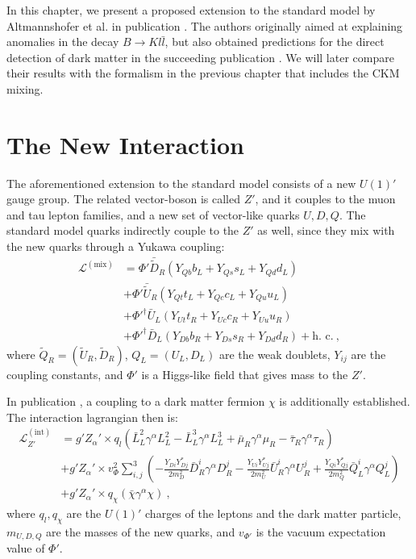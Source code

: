In this chapter, we present a proposed extension to the standard model by Altmannshofer et al. in publication \cite{InColour}. The authors originally aimed at explaining anomalies in the decay $B\rightarrow Kl\bar{l}$, but also obtained predictions for the direct detection of dark matter in the succeeding publication \cite{Z}. We will later compare their results with the formalism in the previous chapter that includes the CKM mixing.

\section{The New Interaction}
The aforementioned extension to the standard model consists of a new $U(1)'$ gauge group. The related vector-boson is called $Z'$, and it couples to the muon and tau lepton families, and a new set of vector-like quarks $U,D,Q$. The standard model quarks indirectly couple to the $Z'$ as well, since they mix with the new quarks through a Yukawa coupling:
\begin{align*}
	\mathcal{L}^{(\text{mix})} &= \Phi' \bar{\tilde{D}}_R(Y_{Qb}b_L + Y_{Qs}s_L + Y_{Qd}d_L) \\
	&+ \Phi'\bar{\tilde{U}}_R(Y_{Qt}t_L + Y_{Qc}c_L + Y_{Qu}u_L) \\
	&+ \Phi'^\dagger\bar{U}_L(Y_{Ut}t_R + Y_{Uc}c_R + Y_{Uu}u_R) \\
	&+ \Phi'^\dagger\bar{D}_L(Y_{Db}b_R + Y_{Ds}s_R + Y_{Dd}d_R) +\text{h. c.} \ ,
\end{align*}
where $\tilde{Q}_R = (\tilde{U}_R,\tilde{D}_R)$, $Q_L = (U_L,D_L)$ are the weak doublets, $Y_{ij}$ are the coupling constants, and $\Phi'$ is a Higgs-like field that gives mass to the $Z'$.


In publication \cite{Z}, a coupling to a dark matter fermion $\chi$ is additionally established. The interaction lagrangian then is:
\begin{align*}
	\mathcal{L}^{(\text{int})}_{Z'} &= g'Z_\alpha'\times q_l\left(\bar{L}_L^2\gamma^\alpha L_L^2 - \bar{L}_L^3\gamma^\alpha L_L^3 + \bar{\mu}_R\gamma^\alpha\mu_R-\bar{\tau}_R\gamma^\alpha\tau_R\right) \\
	&+ g'Z_\alpha'\times v_\Phi^2\sum_{i,j}^3\left(-\frac{Y_{Di}Y^*_{Dj}}{2m_D^2}\bar{D}_R^i\gamma^\alpha D_R^j - \frac{Y_{Ui}Y^*_{Uj}}{2m_U^2}\bar{U}_R^i\gamma^\alpha U_R^j + \frac{Y_{Qi}Y_{Qj}^*}{2m_Q^2}\bar{Q}_L^i\gamma^\alpha Q_L^j\right) \\
	&+ g'Z_\alpha'\times q_\chi(\bar{\chi}\gamma^\alpha\chi) \ ,
\end{align*}
where $q_l,q_\chi$ are the $U(1)'$ charges of the leptons and the dark matter particle, $m_{U,D,Q}$ are the masses of the new quarks, and $v_{\Phi'}$ is the vacuum expectation value of $\Phi'$.


